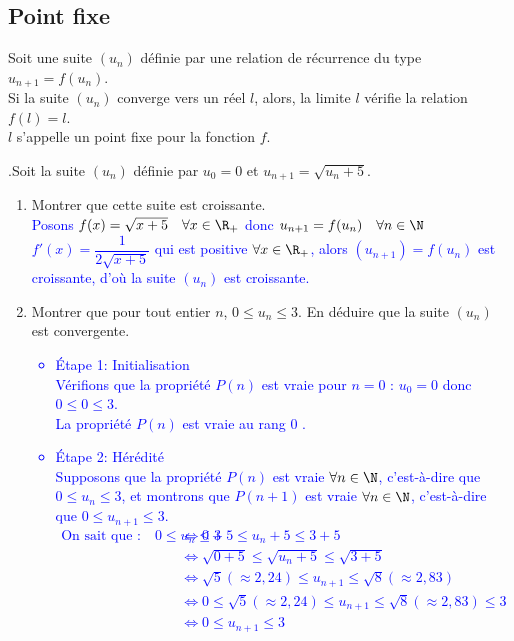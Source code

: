 \documentclass[11pt,twoside, openany]{extbook}
\begin{document}
\subsection{Point fixe}
\begin{trm}
Soit une suite $(u_n)$ définie par une relation de récurrence du type 
  $u_{n+1}=f(u_n)$. \\
  Si la suite $(u_n)$ converge vers un réel $l$, alors, 
  la limite $l$ vérifie la relation $f(l)=l$. \\
  $l$ s'appelle un point fixe pour la fonction $f$. 
\end{trm}
\begin{application}{}
.Soit la suite $(u_n)$ définie par $u_0=0$ et $u_{n+1}=\sqrt{u_n+5}$. 
\begin{enumerate}
    \item Montrer que cette suite est croissante. \\
    \textcolor{blue}{Posons $f(x)=\sqrt{x+5} \quad \forall x \in\R_+ $ donc $u_{n+1}=f(u_n) \quad \forall n \in\N$ \\
$f'(x)=\dfrac{1}{2\sqrt{x+5}}$ qui est positive $\forall x \in\R_+$, alors  $(u_{n+1})=f(u_n)$ est croissante, d'où la suite $(u_n)$ est croissante.}
    \item Montrer que pour tout entier $n$, $0\leq u_n\leq 3$. En déduire que la suite $(u_n)$ est convergente. 
    \textcolor{blue}{\begin{itemize}
      \item Étape 1: Initialisation \\
    Vérifions que la propriété $P(n)$ est vraie pour  $n = 0$ :
    $u_0=0$  donc $0\leq 0\leq 3$. \\ La propriété $P(n)$ est vraie au rang  $0$ .
    \item Étape 2: Hérédité \\
    Supposons que la propriété $P(n)$ est vraie $\forall n\in\N$, c'est-à-dire que $0\leq u_n\leq 3$, et montrons que $P(n+1)$ est vraie $\forall n\in\N$, c'est-à-dire que $0\leq u_{n+1}\leq 3$.
    \begin{align*}
       \text{On sait que :} \quad 0\leq u_n\leq 3 &\iff  0+5\leq u_n+5\leq 3+5 \\&\iff  \sqrt{0+5}\leq \sqrt{u_n+5}\leq \sqrt{3+5} \\&\iff  \sqrt{5}(\approx 2,24)\leq u_{n+1}\leq \sqrt{8}(\approx 2,83) \\&\iff  0 \leq \sqrt{5}(\approx 2,24)\leq u_{n+1}\leq \sqrt{8}(\approx 2,83) \leq 3 \\&\iff  0 \leq  u_{n+1} \leq 3 

\end{align*}
\end{itemize}}
\end{enumerate}
\end{application}
\end{document}

